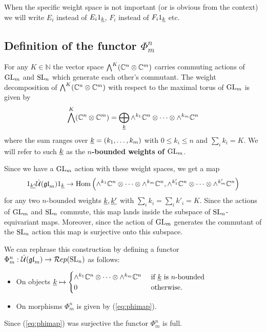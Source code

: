 \documentclass[10pt,leqno]{article}
\begin{document}
\begin{rem} When the specific weight space is not important (or is obvious from the context) we will write $E_i$ instead of $E_i 1_{{\underline{k}}}$, $F_i$ instead of $F_i 1_{{\underline{k}}}$ etc. 
\end{rem}

\subsection{Definition of the functor $\Phi_m^n$}
For any $K \in {\mathbb{N}}$ the vector space $\bigwedge^K(\mathbb C^n \otimes \mathbb C^m)$ carries commuting actions of ${\rm{GL}}_m $ and ${\rm{SL}}_n$ which generate each other's commutant. The weight decomposition of $\bigwedge^K(\mathbb C^n \otimes \mathbb C^m)$ with respect to the maximal torus of $ {\rm{GL}}_m $ is given by 
\begin{equation}
 \bigwedge^K(\mathbb C^n \otimes \mathbb C^m) = \bigoplus_{{\underline{k}}} \wedge^{k_1} \mathbb C^n \otimes \cdots \otimes \wedge^{k_m} \mathbb C^n
 \end{equation}
where the sum ranges over ${\underline{k}} = (k_1, \dots, k_m)$ with $ 0 \le k_i \le n $ and $\sum_i k_i = K$. We will refer to such ${\underline{k}}$ as the {\bf $n$-bounded weights of ${\rm{GL}}_m$}.

Since we have a ${\rm{GL}}_m$ action with these weight spaces, we get a map
\begin{equation}\label{eq:phimap}
1_{\underline{k'}} \dot{{\mathcal{U}}}({\mathfrak{gl}}_m) 1_{\underline{k}} \rightarrow \operatorname{Hom} \left(\wedge^{k_1} \mathbb C^n \otimes \cdots \otimes \wedge^{k_m} \mathbb C^n, \wedge^{k'_1} \mathbb C^n \otimes \cdots \otimes \wedge^{k'_m} \mathbb C^n\right)
\end{equation}
for any two $n$-bounded weights ${\underline{k}}, {\underline{k'}}$ with $\sum_i k_i = \sum_i k'_i = K$. Since the actions of ${\rm{GL}}_m $ and ${\rm{SL}}_n$ commute, this map lands inside the subspace of ${\rm{SL}}_n$-equivariant maps. Moreover, since the action of ${\rm{GL}}_m$ generates the commutant of the ${\rm{SL}}_n$ action this map is surjective onto this subspace.

We can rephrase this construction by defining a functor $\Phi_m^n : \dot{{\mathcal{U}}}({\mathfrak{gl}}_m) \rightarrow \mathcal{R}ep({\rm{SL}}_n)$ as follows:
\begin{itemize}
\item On objects 
${\underline{k}} \mapsto 
\begin{cases} 
\wedge^{k_1} \mathbb C^n \otimes \cdots \otimes \wedge^{k_m} \mathbb C^n & \text{ if } {\underline{k}} \text{ is } n\text{-bounded } \\
0 & \text{ otherwise.}
\end{cases}$ 
\item On morphisms $ \Phi_m^n $ is given by (\ref{eq:phimap}). 
\end{itemize}
Since (\ref{eq:phimap}) was surjective the functor $\Phi_m^n$ is full.
\end{document}
